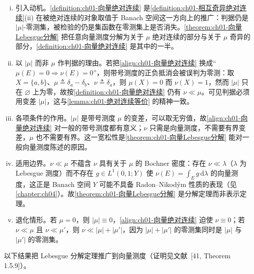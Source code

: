 \documentclass[../../main.tex]{subfiles}%
\begin{document}
\begin{remark}\label{remark:ch01-向量绝对连续动机}
\begin{enumerate}[(i)]
\item 引入动机。\cref{definition:ch01-向量绝对连续} 是\cref{definition:ch01-相互奇异绝对连续}(ii) 在被绝对连续的对象取值于 Banach 空间这一方向上的推广：判据仍是 $|\mu|$-零测集，被检验的仍是集函数在零测集上是否消失。\cref{theorem:ch01-向量Lebesgue分解} 把任意向量测度分解为关于 $\mu$ 绝对连续的部分与关于 $\mu$ 奇异的部分，\cref{definition:ch01-向量绝对连续} 是其中的一半。
\item 以 $|\mu|$ 而非 $\mu$ 作判据的理由。若把\eqref{align:ch01-向量绝对连续} 换成“$\mu(E)=0\Rightarrow\nu(E)=0$”，则带号测度的正负抵消会被误判为零测：取 $X=\{a,b\}$、$\mu\triangleq\delta_a-\delta_b$、$\nu\triangleq\delta_a$，则 $\mu(X)=0$ 而 $\nu(X)=1$，然而 $|\mu|$ 只在 $\varnothing$ 上为零，故按\cref{definition:ch01-向量绝对连续} 仍有 $\nu\ll\mu$。可见判据必须用变差 $|\mu|$，这与\cref{lemma:ch01-绝对连续等价} 的精神一致。
\item 各项条件的作用。$|\mu|$ 是带号测度 $\mu$ 的变差，可以取无穷值，故\eqref{align:ch01-向量绝对连续} 对一般的带号测度都有意义；$\nu$ 只需是向量测度，不需要有界变差，$\mu$ 也不需要有界。这一宽松性是\cref{theorem:ch01-向量Lebesgue分解} 能对一般向量测度陈述的原因。
\item 适用边界。$\nu\ll\mu$ 不蕴含 $\nu$ 具有关于 $\mu$ 的 Bochner 密度：存在 $\nu\ll\lambda$（$\lambda$ 为 Lebesgue 测度）而不存在 $g\in L^1(0,1;Y)$ 使 $\nu(E)=\int_Eg\,\mathrm{d}\lambda$ 的向量测度，这正是 Banach 空间 $Y$ 可能不具备 Radon--Nikodým 性质的表现（见\cref{chapter:ch04}）。故\cref{theorem:ch01-向量Lebesgue分解} 是分解定理而非表示定理。
\item 退化情形。若 $\mu=0$，则 $|\mu|\equiv0$，\eqref{align:ch01-向量绝对连续} 迫使 $\nu\equiv0$；若 $\nu\ll\mu$ 且 $\nu\ll\mu'$，则 $\nu\ll|\mu|+|\mu'|$，因为 $|\mu|+|\mu'|$ 的零测集同时是 $|\mu|$ 与 $|\mu'|$ 的零测集。
\end{enumerate}
\end{remark}

以下结果把 Lebesgue 分解定理推广到向量测度（证明见文献~[41, Theorem 1.5.9]）。
\end{document}
